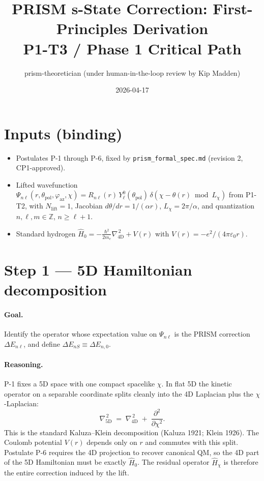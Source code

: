 \documentclass[11pt]{article}
\title{PRISM s-State Correction: First-Principles Derivation\\[2pt]
       \large P1-T3 / Phase 1 Critical Path}
\author{prism-theoretician (under human-in-the-loop review by Kip Madden)}
\date{2026-04-17}
\newcommand{\Lchi}{L_\chi}
\newcommand{\me}{m_e}
\begin{document}
\maketitle

\section*{Inputs (binding)}

\begin{itemize}
  \item Postulates P-1 through P-6, fixed by \texttt{prism\_formal\_spec.md} (revision 2, CP1-approved).
  \item Lifted wavefunction $\Psi_{n\ell}(r,\theta_{\mathrm{pol}},\varphi_{\mathrm{az}},\chi)
        = R_{n\ell}(r)\,Y_\ell^0(\theta_{\mathrm{pol}})\,\delta(\chi - \theta(r)\bmod \Lchi)$
        from P1-T2, with $N_{\text{lift}}=1$, Jacobian $d\theta/dr = 1/(\alpha r)$,
        $L_\chi = 2\pi/\alpha$, and quantization $n,\ell,m\in\mathbb{Z}$, $n\ge\ell+1$.
  \item Standard hydrogen $\hat{H}_0 = -\frac{\hbar^2}{2\me}\nabla_{4\mathrm{D}}^{\,2} + V(r)$
        with $V(r) = -e^2/(4\pi\varepsilon_0 r)$.
\end{itemize}

\section*{Step 1 --- 5D Hamiltonian decomposition}

\paragraph{Goal.}
Identify the operator whose expectation value on $\Psi_{n\ell}$ is the PRISM correction
$\Delta E_{n\ell}$, and define $\Delta E_{nS} \equiv \Delta E_{n,0}$.

\paragraph{Reasoning.}
P-1 fixes a 5D space with one compact spacelike $\chi$. In flat 5D the kinetic operator
on a separable coordinate splits cleanly into the 4D Laplacian plus the $\chi$-Laplacian:
\begin{equation}
  \nabla_{5\mathrm{D}}^{\,2} \;=\; \nabla_{4\mathrm{D}}^{\,2} \;+\; \frac{\partial^2}{\partial\chi^2}.
  \tag{1.1}
\end{equation}
This is the standard Kaluza--Klein decomposition (Kaluza 1921; Klein 1926). The Coulomb potential
$V(r)$ depends only on $r$ and commutes with this split. Postulate P-6 requires the 4D projection
to recover canonical QM, so the 4D part of the 5D Hamiltonian must be exactly $\hat{H}_0$. The
residual operator $\hat{H}_\chi$ is therefore the entire correction induced by the lift.
\end{document}

